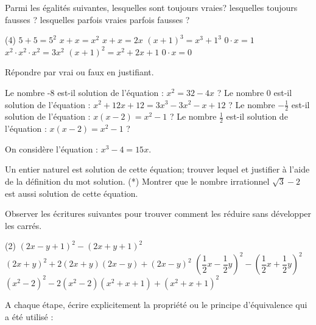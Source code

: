 \documentclass[a4paper,12pt]{report}
\begin{document}
\vspace*{-2\baselineskip}
\begin{acti}
Parmi les égalités suivantes, lesquelles sont toujours vraies? lesquelles toujours fausses ? lesquelles parfois vraies parfois fausses ?
	\begin{tasks}(4)
\task $5+5=5^2$
\task $x+x=x^2$
\task $x+x=2 x$
\task $(x+1)^3=x^3+1^3$
\task $0 \cdot x=1$
\task $x^2 \cdot x^2 \cdot x^2=3 x^2$
\task $(x+1)^2=x^2+2 x+1$
\task $0 \cdot x=0$
	\end{tasks}
\end{acti}
\begin{acti}
	Répondre par vrai ou faux en justifiant.
\begin{tasks}
	\task  Le nombre -8 est-il solution de l'équation : $x^2=32-4 x$ ?
\task Le nombre 0 est-il solution de l'équation : $x^2+12 x+12=3 x^3-3 x^2-x+12$ ?
\task Le nombre $-\frac{1}{2}$ est-il solution de l'équation : $x(x-2)=x^2-1$ ?
\task Le nombre $\frac{1}{2}$ est-il solution de l'équation : $x(x-2)=x^2-1$ ?
\end{tasks}
\end{acti}
\begin{acti}
On considère l'équation : $x^3-4=15 x$.
	\begin{tasks}
\task Un entier naturel est solution de cette équation; trouver lequel et justifier à l'aide de la définition du mot solution.
\task (*) Montrer que le nombre irrationnel $\sqrt{3}-2$ est aussi solution de cette équation.
	\end{tasks}
\end{acti}
\begin{acti}
Observer les écritures suivantes pour trouver comment les réduire sans développer les carrés.
	\begin{tasks}(2)
\task $(2 x-y+1)^2-(2 x+y+1)^2$
\task $(2 x+y)^2+2(2 x+y)(2 x-y)+(2 x-y)^2$
\task $\left(\dfrac{1}{2} x-\dfrac{1}{2} y\right)^2-\left(\dfrac{1}{2} x+\dfrac{1}{2} y\right)^2$
\task $\left(x^2-2\right)^2-2\left(x^2-2\right)\left(x^2+x+1\right)+\left(x^2+x+1\right)^2$
	\end{tasks}
\end{acti}
\begin{acti}
A chaque étape, écrire explicitement la propriété ou le principe d'équivalence qui a été utilisé :
\end{acti}
\end{document}
